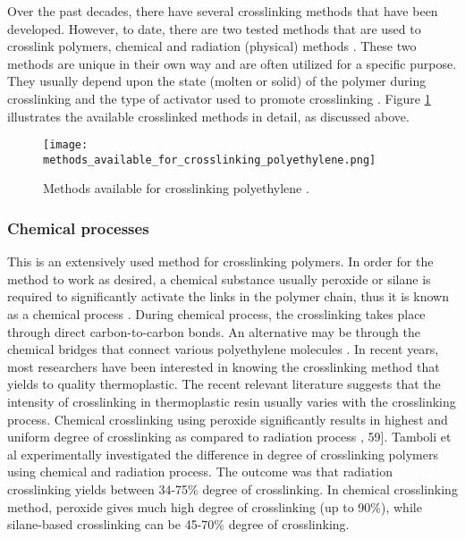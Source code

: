Over the past decades, there have several crosslinking methods that have been developed. However, to date, there are two tested methods that are used to crosslink polymers, chemical and radiation (physical) methods \cite{clemens2017microstructure, bajaj2020steels}. These two methods are unique in their own way and are often utilized for a specific purpose. They usually depend upon the state (molten or solid) of the polymer during crosslinking and the type of activator used to promote crosslinking \cite{kurtz2009cross}. Figure \ref{ch3:figure:crosslinking_methods} illustrates the available crosslinked methods in detail, as discussed above.

\begin{figure}[H]
    \centering
    \texttt{[image: methods\_available\_for\_crosslinking\_polyethylene.png]}
    \caption{Methods available for crosslinking polyethylene \cite{patterson2022cross}.}
    \label{ch3:figure:crosslinking_methods}
\end{figure}

\subsubsection{Chemical processes}
This is an extensively used method for crosslinking polymers. In order for the method to work as desired, a chemical substance usually peroxide or silane is required to significantly activate the links in the polymer chain, thus it is known as a chemical process \cite{meola2005cross}. During chemical process, the crosslinking takes place through direct carbon-to-carbon bonds. An alternative may be through the chemical bridges that connect various polyethylene molecules \cite{kurtz2009cross}.  
In recent years, most researchers have been interested in knowing the crosslinking method that yields to quality thermoplastic. The recent relevant literature suggests that the intensity of crosslinking in thermoplastic resin usually varies with the crosslinking process. Chemical crosslinking using peroxide significantly results in highest and uniform degree of crosslinking as compared to radiation process \cite{clemens2017microstructure}, 59]. Tamboli et al \cite{meola2005cross} experimentally investigated the difference in degree of crosslinking polymers using chemical and radiation process. The outcome was that radiation crosslinking yields between 34-75\% degree of crosslinking. In chemical crosslinking method, peroxide gives much high degree of crosslinking (up to 90\%), while silane-based crosslinking can be 45-70\% degree of crosslinking.

